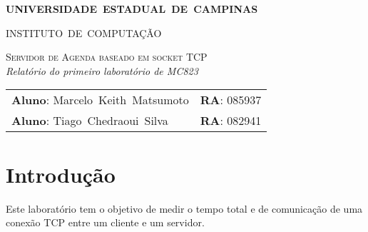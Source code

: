 \documentclass[10pt,a4paper]{article}
\begin{document}
\begin{titlepage}
  \thispagestyle{empty}
  \begin{center} {\large \textbf{UNIVERSIDADE~ESTADUAL~DE~CAMPINAS}} \end{center}
  \begin{center} {\large INSTITUTO~DE~COMPUTAÇÃO}                    \end{center}
  \vspace{0.1cm}
  \begin{center}
    \begin{minipage}[tl]{31mm}
    \end{minipage}
  \end{center}
  \vspace{0.3cm}
  \begin{center} 
    {\large \textsc{Servidor de Agenda baseado em socket TCP
      }} 
    \\\vspace{0.5cm}
    {\textsl{Relatório do primeiro laboratório de MC823}}
    \\\vspace{1cm}
    \begin{tabular}{ll}
      \textbf{Aluno}:        Marcelo~Keith~Matsumoto   &  \textbf{RA}:       085937 \\
      \textbf{Aluno}:        Tiago~Chedraoui~Silva    &   \textbf{RA}:       082941 \\
   
    \end{tabular}
  \end{center}
  \vspace{0.5cm}

  \begin{abstract}

  \end{abstract}

  \tableofcontents
\end{titlepage} 



\section{Introdução}
  Este laboratório tem o objetivo de medir o tempo total e de comunicação de uma conexão TCP entre um cliente e um servidor.
\end{document}
